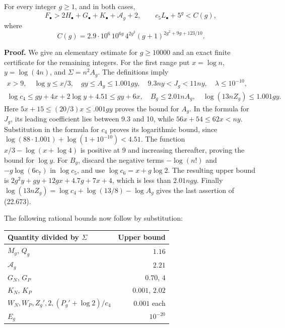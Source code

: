\documentclass[
  11pt,
  a4paper,
]{article}
\newcounter{none} %
\begin{document}
For every integer \(g\ge1\), and in both cases, \[
 F_\bullet>2H_\bullet+G_\bullet+K_\bullet+
                    \mathcal A_g+2,
 \qquad
 c_5L_\bullet+5^g<C(g),
 \tag{22.671}
\] where \[
 C(g)=2.9\cdot10^6\,10^{6g}\,4^{2g^2}
                   (g+1)^{2g^2+9g+123/10}.
 \tag{22.672}
\]

\textbf{Proof.} We give an elementary estimate for \(g\ge10000\) and an
exact finite certificate for the remaining integers. For the first range
put \(x=\log n\), \(y=\log(4n)\), and \(\Sigma=n^2A_g\). The definitions
imply \[
 \begin{gathered}
 x>9,\quad \log y\le x/3,\quad
 gy\le A_g\le1.001gy,\quad
 9.3ny<J_g<11ny,\quad \lambda\le10^{-10},\\
 \log c_4\le gy+4x+2\log y+4.51\le gy+6x,
 \quad B_g\le2.01nA_g,\quad
 \log(13nZ_g)\le1.001gy.
 \end{gathered}
 \tag{22.673}
\] Here \(5x+15\le(20/3)x\le.001gy\) proves the bound for \(A_g\). In
the formula for \(J_g\), its leading coefficient lies between 9.3 and
10, while \(56x+54\le62x<ny\). Substitution in the formula for \(c_4\)
proves its logarithmic bound, since
\(\log(88\cdot1.001)+\log(1+10^{-10})<4.51\). The function
\(x/3-\log(x+\log4)\) is positive at 9 and increasing thereafter,
proving the bound for \(\log y\). For \(B_g\), discard the negative
terms \(-\log(n!)\) and \(-g\log(6c_7)\) in \(\log c_5\), and use
\(\log c_6=x+g\log2\). The resulting upper bound is
\(2g^2y+gy+12gx+4.7g+7x+4\), which is less than \(2.01ngy\). Finally
\(\log(13nZ_g)=\log c_4+\log(13/8)-\log A_g\) gives the last assertion
of (22.673).

The following rational bounds now follow by substitution:

{\def\LTcaptype{none} %
\begin{longtable}[]{@{}lr@{}}
\toprule\noalign{}
Quantity divided by \(\Sigma\) & Upper bound \\
\midrule\noalign{}
\endhead
\bottomrule\noalign{}
\endlastfoot
\(M_g\), \(Q_g\) & \(1.16\) \\
\(\mathcal A_g\) & \(2.21\) \\
\(G_N\), \(G_P\) & \(0.70\), \(4\) \\
\(K_N\), \(K_P\) & \(0.001\), \(2.02\) \\
\(W_N,W_P,Z_g',2,(P_g'+\log2)/c_4\) & \(0.001\) each \\
\(E_g\) & \(10^{-20}\) \\
\end{longtable}
}
\end{document}
